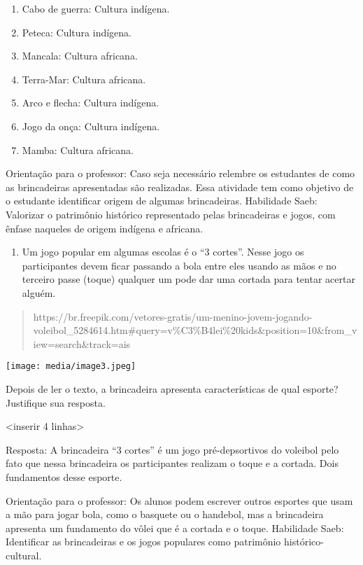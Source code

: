 \begin{enumerate}
\def\labelenumi{\alph{enumi})}
\item
  Cabo de guerra: Cultura indígena.
\item
  Peteca: Cultura indígena.
\item
  Mancala: Cultura africana.
\item
  Terra-Mar: Cultura africana.
\item
  Arco e flecha: Cultura indígena.
\item
  Jogo da onça: Cultura indígena.
\item
  Mamba: Cultura africana.
\end{enumerate}

Orientação para o professor: Caso seja necessário relembre os estudantes
de como as brincadeiras apresentadas são realizadas. Essa atividade tem
como objetivo de o estudante identificar origem de algumas brincadeiras.
Habilidade Saeb: Valorizar o patrimônio histórico representado pelas
brincadeiras e jogos, com ênfase naqueles de origem indígena e africana.

\begin{enumerate}
\def\labelenumi{\arabic{enumi}.}
\item
  Um jogo popular em algumas escolas é o ``3 cortes''. Nesse jogo os
  participantes devem ficar passando a bola entre eles usando as mãos e
  no terceiro passe (toque) qualquer um pode dar uma cortada para tentar
  acertar alguém.
\end{enumerate}

\begin{quote}
https://br.freepik.com/vetores-gratis/um-menino-jovem-jogando-voleibol\_5284614.htm\#query=v\%C3\%B4lei\%20kids\&position=10\&from\_view=search\&track=ais
\end{quote}

\texttt{[image: media/image3.jpeg]}

Depois de ler o texto, a brincadeira apresenta características de qual
esporte? Justifique sua resposta.

\textless{}inserir 4 linhas\textgreater{}

Resposta: A brincadeira ``3 cortes'' é um jogo pré-depsortivos do
voleibol pelo fato que nessa brincadeira os participantes realizam o
toque e a cortada. Dois fundamentos desse esporte.

Orientação para o professor: Os alunos podem escrever outros esportes
que usam a mão para jogar bola, como o basquete ou o handebol, mas a
brincadeira apresenta um fundamento do vôlei que é a cortada e o toque.
Habilidade Saeb: Identificar as brincadeiras e os jogos populares como
patrimônio histórico-cultural.

